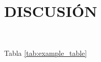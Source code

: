 \pagestyle{fancy}
\section{DISCUSIÓN}

    \begin{justify}
        \lipsum[1] \\
    \end{justify}
    
    \begin{justify}
        \lipsum[2][1-5] Tabla \ref{tab:example_table} \lipsum[2][6-10]  \\
    \end{justify}
    
    \begin{justify}
        \lipsum[3] \\
    \end{justify}
